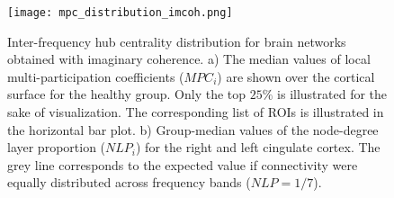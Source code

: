 \newpage
\begin{figure}[!ht]
	\centering
	\texttt{[image: mpc\_distribution\_imcoh.png]}
	\caption{Inter-frequency hub centrality distribution for brain networks obtained with imaginary coherence. a) The median values of local multi-participation coefficients ($MPC_i$) are shown over the cortical surface for the healthy group. Only the top $25\%$ is illustrated for the sake of visualization. The corresponding list of ROIs is illustrated in the horizontal bar plot. b) Group-median values of the node-degree layer proportion ($NLP_i$) for the right and left cingulate cortex. The grey line corresponds to the expected value if connectivity were equally distributed across frequency bands ($NLP=1/7$).}
	\label{fig:mpc_imcoh}
\end{figure}


